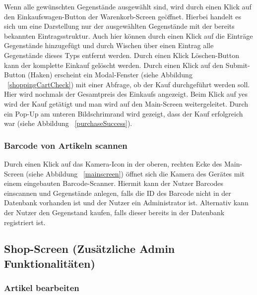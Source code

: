 Wenn alle gewünschten Gegenstände ausgewählt sind, wird durch einen Klick auf den Einkaufswagen-Button der Warenkorb-Screen geöffnet.
Hierbei handelt es sich um eine Darstellung nur der ausgewählten Gegenstände mit der bereits bekannten Eintragsstruktur.
Auch hier können durch einen Klick auf die Einträge Gegenstände hinzugefügt und durch Wischen über einen Eintrag alle Gegenstände dieses Typs entfernt werden.
Durch einen Klick Löschen-Button kann der komplette Einkauf gelöscht werden.
Durch einen Klick auf den Submit-Button (Haken) erscheint ein Modal-Fenster (siehe Abbildung ~\ref{shoppingCartCheck}) mit einer Abfrage, ob der Kauf durchgeführt werden soll.
Hier wird nochmals der Gesamtpreis des Einkaufs angezeigt.
Beim Klick auf \glqq yes\grqq{} wird der Kauf getätigt und man wird auf den Main-Screen weitergeleitet.
Durch ein Pop-Up am unteren Bildschrimrand wird gezeigt, dass der Kauf erfolgreich war (siehe Abbildung ~\ref{purchaseSuccess}).



\subsubsection{Barcode von Artikeln scannen} \label{subsubsec:shop-scan-item}

Durch einen Klick auf das Kamera-Icon in der oberen, rechten Ecke des Main-Screen (siehe Abbildung ~\ref{mainscreen}) öffnet sich die Kamera des Gerätes mit einem eingebauten Barcode-Scanner.
Hiermit kann der Nutzer Barcodes einscannen und Gegenstände anlegen, falls die ID des Barcode nicht in der Datenbank vorhanden ist und der Nutzer ein Administrator ist.
Alternativ kann der Nutzer den Gegenstand kaufen, falls dieser bereits in der Datenbank registriert ist.

\subsection{Shop-Screen (Zusätzliche Admin Funktionalitäten)} \label{subsec:shop-admin}

\subsubsection{Artikel bearbeiten} \label{subsubsec:shop-edit-items}

